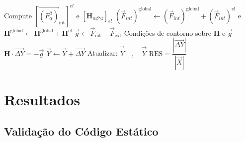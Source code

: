 \documentclass{beamer}
\begin{document}
\begin{frame}

    \begin{algorithm}[H]
        \caption{Pseudo-Algoritmo}
        \begin{algorithmic}[1]
            \footnotesize %
                        \State Compute $\left[\vec{(F^\beta_\alpha)}_{\text{int}}\right]^{el}$ \quad e \quad $\left[\mathbf{H} _{\alpha\beta\gamma z}\right]_{el}$
                    \EndFor
                    \State $\left(\vec{F}_{int}\right)^{\text{global}} \gets \left(\vec{F}_{int}\right)^{\text{global}} + \left(\vec{F}_{int}\right)^{\text{el}}$ \quad  e \quad  $\mathbf{H}^{\text{global}} \gets \mathbf{H}^{\text{global}} + \mathbf{H}^{\text{el}}$
                    \State $\vec{g} \gets  \vec{F}_{\text{int}} - \vec{F}_{\text{ext}}$
                    \State Condições de contorno sobre $\mathbf{H}$ e $\vec{g}$ 
                    \State $\mathbf{H} \cdot \vec{\Delta Y} = -\vec{g}$
                    \State $\vec{Y} \gets \vec{Y} + \vec{\Delta Y}$
                    \State Atualizar: $\vec{\dot{Y}} \quad , \quad \vec{\ddot{Y}}$
                    \State $\mathrm{RES} = \dfrac{|\vec{\Delta Y}|}{|\vec{X}|}$
                \EndWhile
            \EndFor
        \end{algorithmic}
    \end{algorithm}
        

\end{frame}


\section{Resultados}
\subsection{Validação do Código Estático}
\end{document}
